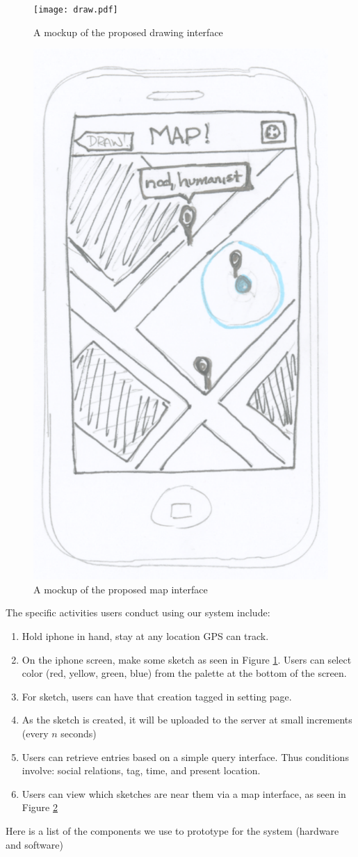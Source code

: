\documentclass{chi2009}
\begin{document}
\begin{figure}
\centering
\texttt{[image: draw.pdf]}
\caption{A mockup of the proposed drawing interface}
\label{fig:draw}
\end{figure}

\begin{figure}
\centering
\includegraphics[width=.3\textwidth]{map.pdf}
\caption{A mockup of the proposed map interface}
\label{fig:map}
\end{figure}

The specific activities users conduct using our system include:
\begin{enumerate}
\item Hold iphone in hand, stay at any location GPS can track.
\item On the iphone screen, make some sketch as seen in Figure \ref{fig:draw}. Users can select color (red, yellow, green, blue) from the palette at the bottom of the screen.
\item For sketch, users can have that creation tagged in setting page.
\item As the sketch is created, it will be uploaded to the server at small
	increments (every $n$ seconds)
\item Users can retrieve entries based on a simple query interface. Thus
	conditions involve: social relations, tag, time, and present location.
\item Users can view which sketches are near them via a map interface, as seen
	in Figure \ref{fig:map}
\end{enumerate}

Here is a list of the components we use to prototype for
the system (hardware and software)
\end{document}

